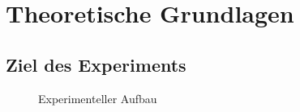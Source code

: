 \documentclass{include/thesisclass3}
\begin{document}
	\FrontMatter
	
	\tableofcontents                  
	\newpage
	\MainMatter


\chapter{Theoretische Grundlagen}
\section{Ziel des Experiments}

\begin{figure}[ht]
	\begin{center}
		\caption{Experimenteller Aufbau}
		\label{aufbau}
	\end{center}
\end{figure}
\end{document}
